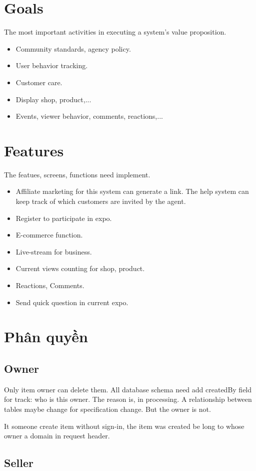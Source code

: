 \documentclass{report}
\begin{document}
\section{Goals}
The most important activities in executing a system's value proposition.
\begin{itemize}
	\item Community standards, agency policy.
	\item User behavior tracking.
	\item Customer care.
	\item Display shop, product,...
	\item Events, viewer behavior, comments, reactions,...
\end{itemize}
\section{Features}
The featues, screens, functions need implement.
\begin{itemize}
	\item Affiliate marketing for this system can generate a link. The help system can keep track of which customers are invited by the agent.
	\item Register to participate in expo. 
	\item E-commerce function.
	\item Live-stream for business.
	\item Current views counting for shop, product.
	\item Reactions, Comments.
	\item Send quick question in current expo.
\end{itemize}
\section{Phân quyền}
\subsection{Owner}
Only item owner can delete them. All database schema need add createdBy field for track: who is this owner. The reason is, in processing. A relationship between tables maybe change for specification change. But the owner is not.

It someone create item without sign-in, the item was created be long to whose owner a domain in request header.
\subsection{Seller}
\end{document}
